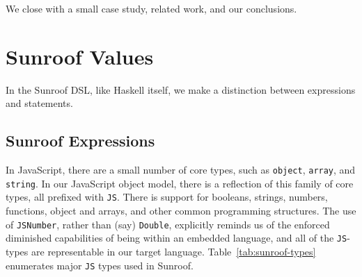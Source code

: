 \documentclass{llncs}
\newcommand{\Src}[1]{{\tt{#1}}}
\begin{document}
We close with a small case study, related work, and our conclusions.



\section{Sunroof Values}
\label{sec:object-model}

In the Sunroof DSL, like Haskell itself, we make a distinction between expressions and statements.

\subsection{Sunroof Expressions}

In JavaScript, there are a small number of core types, such as \Src{object}, \Src{array}, and \Src{string}.
In our JavaScript object model, there is a reflection of this family of core types, all prefixed with \Src{JS}.
There is support for booleans, strings, numbers, functions,
object and arrays, and other common programming structures.
The use of \Src{JSNumber}, rather than (say) \Src{Double},
explicitly reminds us of the enforced diminished capabilities of
being within an embedded language,
and all of the \Src{JS}-types are representable in our target language.
Table~\ref{tab:sunroof-types} enumerates major \Src{JS} types used in Sunroof.
\end{document}
